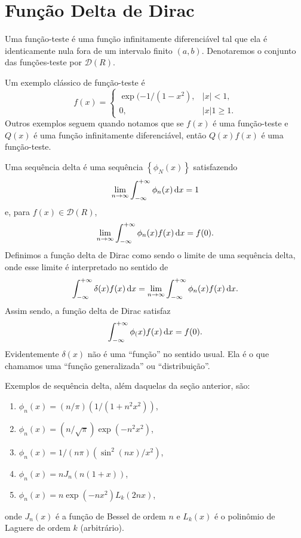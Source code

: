 \section{Função Delta de Dirac}
\begin{defi}
  Uma função-teste é uma função infinitamente diferenciável tal que ela é
  identicamente nula fora de um intervalo finito $(a, b)$. Denotaremos o
  conjunto das funções-teste por $\mathcal{D}(R)$.
\end{defi}
\begin{exem}
  Um exemplo clássico de função-teste é
  \begin{dmath*}
    f(x) = \begin{cases}
      \exp(-1 / (1 - x^2), & \lvert x \rvert < 1, \\
      0, & \lvert x \rvert 1 \geq 1.
    \end{cases}
  \end{dmath*}
  Outros exemplos seguem quando notamos que se $f(x)$ é uma função-teste e
  $Q(x)$ é uma função infinitamente diferenciável, então $Q(x) f(x)$ é uma
  função-teste.
\end{exem}
\begin{defi}
  Uma sequência delta é uma sequência $\left\{ \phi_N(x) \right\}$ satisfazendo
  \begin{dmath*}
    \lim_{n \to \infty} \int_{-\infty}^{+\infty} \phi_n(x) \vi{x} = 1
  \end{dmath*}
  e, para $f(x) \in \mathcal{D}(R)$,
  \begin{dmath*}
    \lim_{n \to \infty} \int_{-\infty}^{+\infty} \phi_n(x) f(x) \vi{x} = f(0).
  \end{dmath*}
  Definimos a função delta de Dirac como sendo o limite de uma sequência delta,
  onde esse limite é interpretado no sentido de
  \begin{dmath*}
    \int_{-\infty}^{+\infty} \delta(x) f(x) \vi{x} = \lim_{n \to \infty}
    \int_{-\infty}^{+\infty} \phi_n(x) f(x) \vi{x}.
  \end{dmath*}
  Assim sendo, a função delta de Dirac satisfaz
  \begin{dmath*}
    \int_{-\infty}^{+\infty} \phi_(x) f(x) \vi{x} = f(0).
  \end{dmath*}
  Evidentemente $\delta(x)$ não é uma ``função'' no sentido usual. Ela é o que
  chamamos uma ``função generalizada'' ou ``distribuição''.
\end{defi}
\begin{exem}
  Exemplos de sequência delta, além daquelas da seção anterior, são:
  \begin{enumerate}
    \item $\phi_n(x) = (n / \pi) (1 / (1 + n^2 x^2))$,
    \item $\phi_n(x) = (n / \sqrt{\pi}) \exp(-n^2 x^2)$,
    \item $\phi_n(x) = 1 / (n \pi) (\sin^2(n x) / x^2)$,
    \item $\phi_n(x) = n J_n(n (1 + x))$,
    \item $\phi_n(x) = n \exp(-n x^2) L_k(2 n x)$,
  \end{enumerate}
  onde $J_n(x)$ é a função de Bessel de ordem $n$ e $L_k(x)$ é o polinômio de
  Laguere de ordem $k$ (arbitrário).
\end{exem}

